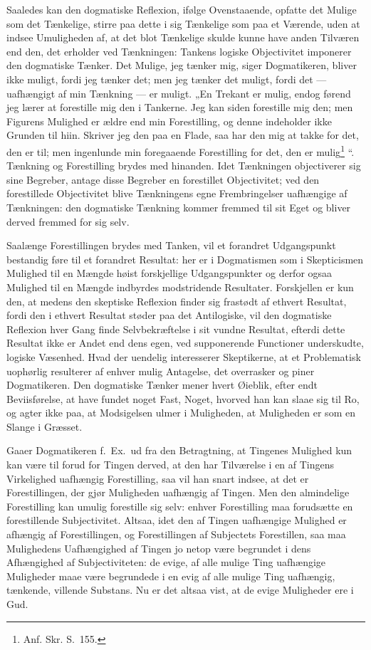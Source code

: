 \documentclass[12pt]{book}
\newcommand{\opage}[1]{\marginnote{\footnotesize\textit{[#1]}}}
\begin{document}
Saaledes kan den dogmatiske Reflexion, ifølge Ovenstaaende, opfatte det Mulige som det Tænkelige, stirre paa dette i sig Tænkelige som paa et Værende, uden at indsee Umuligheden af, at det blot Tænkelige skulde kunne have anden Tilværen end den, det erholder ved Tænkningen: Tankens logiske Objectivitet imponerer den dogmatiske Tænker. Det Mulige, jeg tænker mig, siger Dogmatikeren, bliver ikke muligt, fordi jeg tænker det; men jeg tænker det muligt, fordi det --- uafhængigt af min Tænkning --- er muligt. „En Trekant er mulig, endog førend jeg lærer at forestille mig den i Tankerne. Jeg kan siden forestille mig den; men Figurens Mulighed er ældre end min Forestilling, og denne indeholder ikke Grunden til hiin. Skriver jeg den paa en Flade, saa har den mig at takke for det, den er til; men ingenlunde min foregaaende Forestilling for det, den er mulig\footnote{Anf. Skr. S.~155.}%
“. Tænkning og Forestilling brydes med hinanden. Idet Tænkningen objectiverer sig sine Begreber, antage disse Begreber en forestillet Objectivitet; ved den forestillede Objectivitet blive Tænkningens egne Frembringelser uafhængige af Tænkningen: den dogmatiske Tænkning kommer fremmed til sit Eget og bliver derved fremmed for sig selv.

\opage{230}Saalænge Forestillingen brydes med Tanken, vil et forandret Udgangspunkt bestandig føre til et forandret Resultat: her er i Dogmatismen som i Skepticismen Mulighed til en Mængde høist forskjellige Udgangspunkter og derfor ogsaa Mulighed til en Mængde indbyrdes modstridende Resultater. Forskjellen er kun den, at medens den skeptiske Reflexion finder sig frastødt af ethvert Resultat, fordi den i ethvert Resultat støder paa det Antilogiske, vil den dogmatiske Reflexion hver Gang finde Selvbekræftelse i sit vundne Resultat, efterdi dette Resultat ikke er Andet end dens egen, ved supponerende Functioner underskudte, logiske Væsenhed. Hvad der uendelig interesserer Skeptikerne, at et Problematisk uophørlig resulterer af enhver mulig Antagelse, det overrasker og piner Dogmatikeren. Den dogmatiske Tænker mener hvert Øieblik, efter endt Beviisførelse, at have fundet noget Fast, Noget, hvorved han kan slaae sig til Ro, og agter ikke paa, at Modsigelsen ulmer i Muligheden, at Muligheden er som en Slange i Græsset.

Gaaer Dogmatikeren f.\ Ex.\ ud fra den Betragtning, at Tingenes Mulighed kun kan være til forud for Tingen derved, at den har Tilværelse i en af Tingens Virkelighed uafhængig Forestilling, saa vil han snart indsee, at det er Forestillingen, der gjør Muligheden uafhængig af Tingen. Men den almindelige Forestilling kan umulig forestille sig selv: enhver Forestilling maa forudsætte en forestillende Subjectivitet. Altsaa, idet den af Tingen uafhængige Mulighed er afhængig af Forestillingen, og Forestillingen af Subjectets Forestillen, saa maa Mulighedens Uafhængighed af Tingen jo netop være begrundet i dens Afhængighed af Subjectiviteten: de evige, af alle mulige Ting uafhængige Muligheder maae være begrundede i en evig af alle mulige Ting uafhængig, tænkende, villende Substans. Nu er det altsaa vist, at de evige Muligheder ere i Gud.
\end{document}
